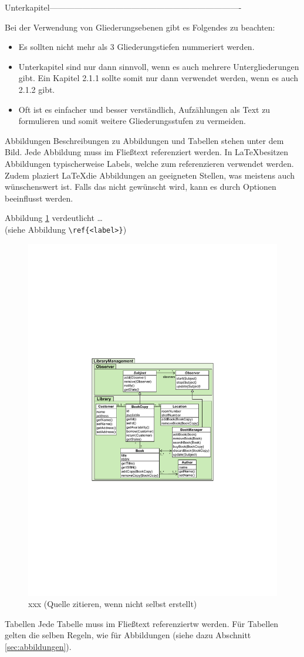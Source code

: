 Unterkapitel----------------------------------------------------------------------

Bei der Verwendung von Gliederungsebenen gibt es Folgendes zu beachten:
\begin{itemize}
	\item Es sollten nicht mehr als 3 Gliederungstiefen nummeriert werden.
	\item Unterkapitel sind nur dann sinnvoll, wenn es auch mehrere Untergliederungen gibt. Ein Kapitel 2.1.1 sollte somit nur dann verwendet werden, wenn es auch 2.1.2 gibt.
	\item Oft ist es einfacher und besser verständlich, Aufzählungen als Text zu formulieren und somit weitere Gliederungsstufen zu vermeiden.
\end{itemize}

Abbildungen
Beschreibungen zu Abbildungen und Tabellen stehen unter dem Bild. Jede Abbildung muss im Fließtext referenziert werden. In \LaTeX besitzen Abbildungen typischerweise Labels, welche zum referenzieren verwendet werden. Zudem plaziert \LaTeX die Abbildungen an geeigneten Stellen, was meistens auch wünschenswert ist. Falls das nicht gewünscht wird, kann es durch Optionen beeinflusst werden.

Abbildung \ref{fig:xxx} verdeutlicht  \dots\\
(siehe Abbildung \verb|\ref{<label>}|)

\begin{figure}
	\centering
	\includegraphics[width=0.4\linewidth]{figures/figure1}
	\caption{xxx (Quelle zitieren, wenn nicht selbst erstellt)}
	\label{fig:xxx}
\end{figure}
Tabellen
Jede Tabelle muss im Fließtext referenziertw werden. Für Tabellen gelten die selben Regeln, wie für Abbildungen (siehe dazu Abschnitt \ref{sec:abbildungen}).

